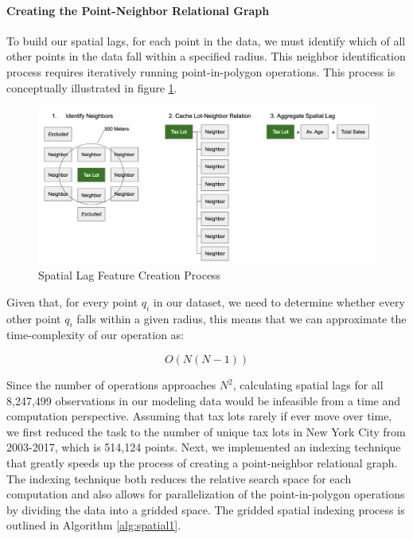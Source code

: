\documentclass[conference,final,]{IEEEtran}
\makeatletter
\def\maxwidth{\ifdim\Gin@nat@width>\linewidth\linewidth
\else\Gin@nat@width\fi}
\let\Oldincludegraphics\includegraphics
\renewcommand{\includegraphics}[1]{\Oldincludegraphics[width=\maxwidth]{#1}}
\makeatother
\begin{document}
\hypertarget{creating-the-point-neighbor-relational-graph}{%
\paragraph{Creating the Point-Neighbor Relational
Graph}\label{creating-the-point-neighbor-relational-graph}}

To build our spatial lags, for each point in the data, we must identify
which of all other points in the data fall within a specified radius.
This neighbor identification process requires iteratively running
point-in-polygon operations. This process is conceptually illustrated in
figure \ref{fig:Spatial Lag Feataure Process}.

\begin{figure}
\centering
\includegraphics{Sections/tables_and_figures/Spatial_Lag_Creation.png}
\caption{\label{fig:Spatial Lag Feataure Process}Spatial Lag Feature
Creation Process}
\end{figure}

Given that, for every point \(q_i\) in our dataset, we need to determine
whether every other point \(q_i\) falls within a given radius, this
means that we can approximate the time-complexity of our operation as:

\[
O(N(N-1))
\]

Since the number of operations approaches \(N^2\), calculating spatial
lags for all 8,247,499 observations in our modeling data would be
infeasible from a time and computation perspective. Assuming that tax
lots rarely if ever move over time, we first reduced the task to the
number of unique tax lots in New York City from 2003-2017, which is
514,124 points. Next, we implemented an indexing technique that greatly
speeds up the process of creating a point-neighbor relational graph. The
indexing technique both reduces the relative search space for each
computation and also allows for parallelization of the point-in-polygon
operations by dividing the data into a gridded space. The gridded
spatial indexing process is outlined in Algorithm \ref{alg:spatial1}.
\end{document}
